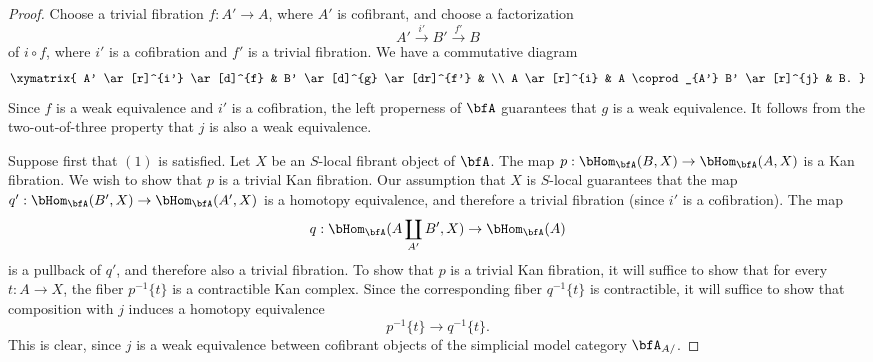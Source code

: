 \begin{proof}
Choose a trivial fibration
$f: A' \rightarrow A$, where $A'$ is cofibrant, and choose a factorization
$$ A' \stackrel{i'}{\rightarrow} B' \stackrel{f'}{\rightarrow} B$$ of
$i \circ f$, where $i'$ is a cofibration and $f'$ is a trivial fibration. We have a commutative diagram
$$ \xymatrix{ A' \ar[r]^{i'} \ar[d]^{f} & B' \ar[d]^{g} \ar[dr]^{f'} & \\
A \ar[r]^{i} & A \coprod_{A'} B' \ar[r]^{j} & B. }$$
Since $f$ is a weak equivalence and $i'$ is a cofibration, the left properness of $\bfA$ guarantees that $g$ is a weak equivalence. It follows from the two-out-of-three property that $j$ is also a weak equivalence.

Suppose first that $(1)$ is satisfied. Let $X$ be an $S$-local fibrant object of $\bfA$. 
The map $p: \bHom_{\bfA}(B,X) \rightarrow \bHom_{\bfA}(A,X)$ is a Kan fibration. We wish to show that $p$ is a trivial Kan fibration. Our assumption that $X$ is $S$-local guarantees that the map
$q': \bHom_{\bfA}(B',X) \rightarrow \bHom_{\bfA}(A', X)$ is a homotopy equivalence, and therefore a trivial fibration (since $i'$ is a cofibration). The map
$$q: \bHom_{\bfA}( A \coprod_{A'} B', X) \rightarrow \bHom_{\bfA}(A)$$ is a pullback of $q'$, and therefore also a trivial fibration. To show that $p$ is a trivial Kan fibration, it will suffice to show that
for every $t: A \rightarrow X$, the fiber $p^{-1} \{ t\}$ is a contractible Kan complex. Since the corresponding fiber $q^{-1} \{t\}$ is contractible, it will suffice to show that composition with $j$ induces a homotopy equivalence $$ p^{-1} \{t\} \rightarrow q^{-1} \{t\}. $$
This is clear, since $j$ is a weak equivalence between cofibrant objects of the simplicial model category $\bfA_{A/}$.


\end{proof}
